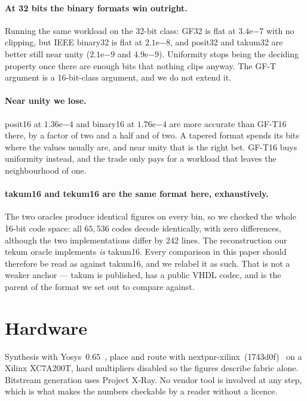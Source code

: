\documentclass[11pt]{article}
\begin{document}
\paragraph{At 32 bits the binary formats win outright.} Running the same
workload on the 32-bit class: GF32 is flat at $3.4\mathrm{e}{-7}$ with no
clipping, but IEEE binary32 is flat at $2.1\mathrm{e}{-8}$, and posit32 and
takum32 are better still near unity ($2.1\mathrm{e}{-9}$ and
$4.9\mathrm{e}{-9}$). Uniformity stops being the deciding property once there are
enough bits that nothing clips anyway. The GF-T argument is a 16-bit-class
argument, and we do not extend it.

\paragraph{Near unity we lose.} posit16 at $1.36\mathrm{e}{-4}$ and binary16 at
$1.76\mathrm{e}{-4}$ are more accurate than GF-T16 there, by a factor of two and
a half and of two. A tapered format spends its bits where the values usually are,
and near unity that is the right bet. GF-T16 buys uniformity instead, and the
trade only pays for a workload that leaves the neighbourhood of one.

\paragraph{takum16 and tekum16 are the same format here, exhaustively.} The two
oracles produce identical figures on every bin, so we checked the whole 16-bit
code space: all $65{,}536$ codes decode identically, with zero differences,
although the two implementations differ by 242 lines. The reconstruction our
tekum oracle implements \emph{is} takum16. Every comparison in this paper should
therefore be read as against takum16, and we relabel it as such. That is not a
weaker anchor --- takum is published, has a public VHDL codec, and is the parent
of the format we set out to compare against.

\section{Hardware}\label{sec:hardware}

Synthesis with Yosys~0.65~\cite{yosys}, place and route with
nextpnr-xilinx~(1743d0f)~\cite{nextpnr} on a
Xilinx XC7A200T, hard multipliers disabled so the figures describe fabric alone.
Bitstream generation uses Project X-Ray. No vendor tool is involved at any step,
which is what makes the numbers checkable by a reader without a licence.
\end{document}
